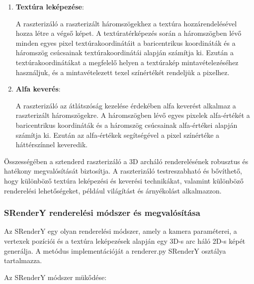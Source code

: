 \documentclass[12pt,a4]{article}
\begin{document}
\begin{enumerate}
     \item \textbf{Textúra leképezése}:
     
     A raszterizáló a raszterizált háromszögekhez a textúra hozzárendelésével  hozza létre a végső képet. 
A textúratérképezés során a háromszögben lévő minden egyes pixel textúrakoordinátáit a baricentrikus koordináták és a háromszög csúcsainak textúrakoordinátái alapján számítja ki.
	Ezután a textúrakoordinátákat a megfelelő helyen a textúrakép mintavételezéséhez használjuk, és a mintavételezett texel színértékét rendeljük a pixelhez.
 
     \item \textbf{Alfa keverés}:
     
     A raszterizáló az átlátszóság kezelése érdekében alfa keverést alkalmaz a raszterizált háromszögekre. 
	A háromszögben lévő egyes pixelek alfa-értékét a baricentrikus koordináták és a háromszög csúcsainak alfa-értékei alapján számítja ki. 
	Ezután az alfa-értékek segítségével a pixel színértéke a háttérszínnel keveredik.
 
 \end{enumerate}
 
 Összességében a sztenderd raszterizáló a 3D archáló renderelésének robusztus és hatékony megvalósítását biztosítja.
 A raszterizáló testreszabható és bővíthető, hogy különböző textúra leképezési és keverési technikákat, valamint különböző renderelési lehetőségeket, például világítást és árnyékolást alkalmazzon.

\subsubsection{SRenderY renderelési módszer és megvalósítása}
 Az SRenderY egy olyan renderelési módszer, amely a kamera paraméterei, a vertexek pozíciói és a textúra leképezések alapján egy 3D-s arc háló 2D-s képét generálja. A metódus implementációját a renderer.py SRenderY osztálya tartalmazza. \newline


 Az SRenderY módszer mükődése:
\end{document}
